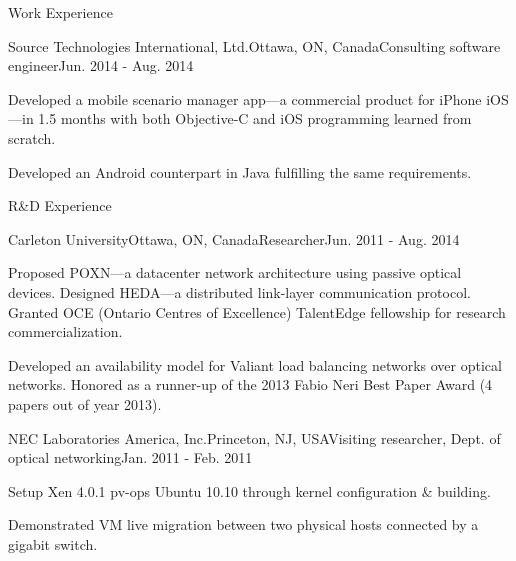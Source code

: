 \documentclass{resume} %
\begin{document}
\begin{rSection}{Work Experience}

\begin{rSubsection}{Source Technologies International, Ltd.}{Ottawa, ON, Canada}{Consulting software engineer}{Jun. 2014 - Aug. 2014}
\item Developed a mobile scenario manager app---a commercial product for iPhone iOS---in 1.5 months with both Objective-C and iOS programming learned from scratch.
\item Developed an Android counterpart in Java fulfilling the same requirements.
\end{rSubsection}

\end{rSection}


\begin{rSection}{R\&D Experience}

\begin{rSubsection}{Carleton University}{Ottawa, ON, Canada}{Researcher}{Jun. 2011 - Aug. 2014}
\item Proposed POXN---a datacenter network architecture using passive optical devices. Designed HEDA---a distributed link-layer communication protocol.
Granted OCE (Ontario Centres of Excellence) TalentEdge fellowship for research commercialization. %
\item Developed an availability model for Valiant load balancing networks over optical networks.
Honored as a runner-up of the 2013 Fabio Neri Best Paper Award (4 papers out of year 2013).
\end{rSubsection}


\begin{rSubsection}{NEC Laboratories America, Inc.}{Princeton, NJ, USA}{Visiting researcher, Dept. of optical networking}{Jan. 2011 - Feb. 2011}
\item Setup Xen 4.0.1 pv-ops Ubuntu 10.10 through kernel configuration \& building. 
\item Demonstrated VM live migration between two physical hosts connected by a gigabit switch.
\end{rSubsection}

\end{rSection}



\end{document}
